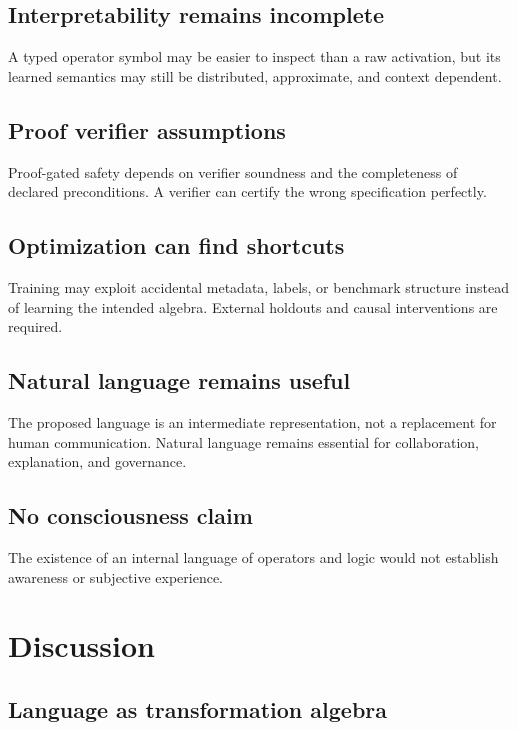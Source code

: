 \documentclass[11pt]{article}
\theoremstyle{definition}
\theoremstyle{remark}
\begin{document}
\subsection{Interpretability remains incomplete}

A typed operator symbol may be easier to inspect than a raw activation, but its learned semantics may still be distributed, approximate, and context dependent.

\subsection{Proof verifier assumptions}

Proof-gated safety depends on verifier soundness and the completeness of declared preconditions. A verifier can certify the wrong specification perfectly.

\subsection{Optimization can find shortcuts}

Training may exploit accidental metadata, labels, or benchmark structure instead of learning the intended algebra. External holdouts and causal interventions are required.

\subsection{Natural language remains useful}

The proposed language is an intermediate representation, not a replacement for human communication. Natural language remains essential for collaboration, explanation, and governance.

\subsection{No consciousness claim}

The existence of an internal language of operators and logic would not establish awareness or subjective experience.

\section{Discussion}

\subsection{Language as transformation algebra}
\end{document}
